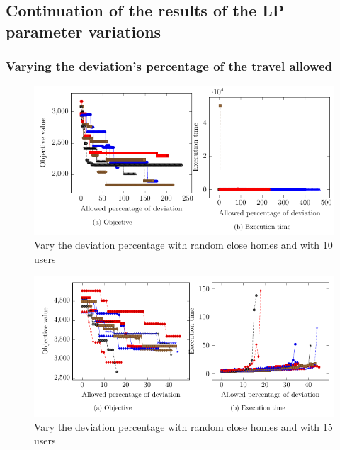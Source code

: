 \documentclass[12pt, a4paper, twoside]{memoir}
\begin{document}
{	\subsection{Continuation of the results of the LP parameter variations}
	\label{app:Continuation of the results of the LP parameter variations}
	\subsubsection{Varying the deviation's percentage of the travel allowed}
	
	\begin{figure}[H]
		\centering
		\begin{flushleft}
			\includegraphics[scale=0.9]{img/compiledResults/5.png}
		\end{flushleft}
		\caption{Vary the deviation percentage with random close homes and with 10 users}
		\label{fig:Vary the deviation percentage with random close homes and with 10 users}
	\end{figure}
	
	\begin{figure}[H]
		\centering
		\begin{flushleft}
			\floatplacement{figure}{t}
			\includegraphics[scale=0.9]{img/compiledResults/6.png}
		\end{flushleft}
		\caption{Vary the deviation percentage with random close homes and with 15 users}
		\label{fig:Vary the deviation percentage with random close homes and with 15 users}
	\end{figure}
	
}
\end{document}
